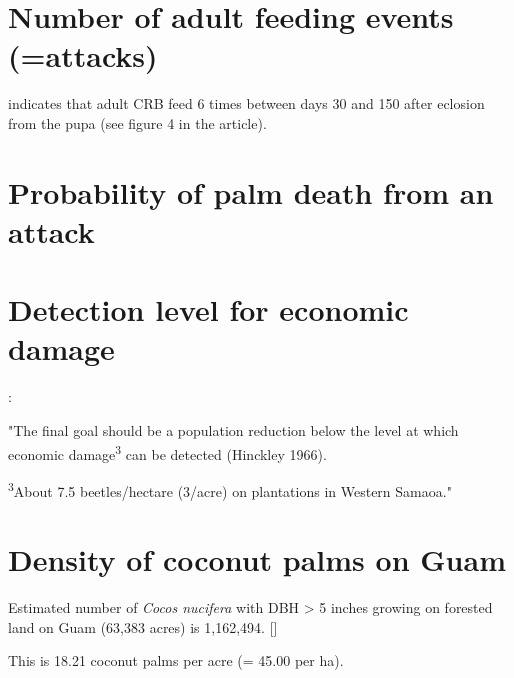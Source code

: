 \documentclass[12pt,letterpaper,english,bibliography=totocnumbered, abstract=on]{scrartcl}
\begin{document}
\section{Number of adult feeding events (=attacks)}

\cite{vander_meer_per_1987} indicates that adult CRB feed 6 times between days 30 and 150 after eclosion from the pupa (see figure 4 in the article).

\section{Probability of palm death from an attack}


\section{Detection level for economic damage}

\cite{hinckley_ecology_1973}:

"The final goal should be a population reduction below the level at which economic damage\textsuperscript{3} can be detected (Hinckley 1966).

\textsuperscript{3}About 7.5 beetles/hectare (3/acre) on plantations in Western Samaoa."

\section{Density of coconut palms on Guam}

Estimated number of \textit{Cocos nucifera} with DBH > 5 inches growing on forested land on Guam (63,383 acres) is 1,162,494. [\cite{donnegon_guams_2004}] 

This is 18.21 coconut palms per acre (=	45.00 per ha).

\newpage
\printbibliography
\end{document}
